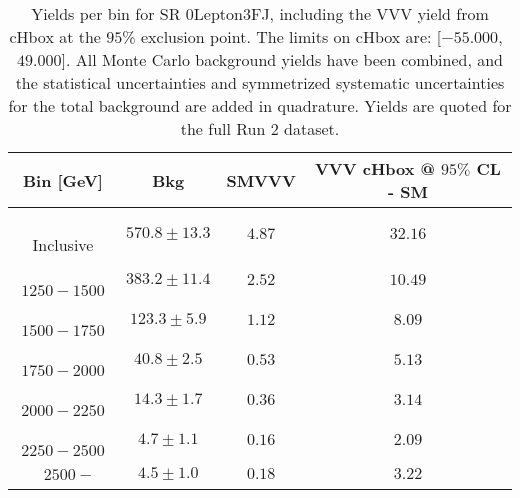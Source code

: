 \begin{table}[!htbp]
    \small
    \center
    \begin{tabular}{c||c|c|c}
    Bin [GeV] & Bkg & SMVVV & \pbox{20cm}{VVV \\ cHbox @ $95\%$ CL - SM \\ }\\
    \hline
    \pbox{20cm}{ ~ \\Inclusive\\ } & $570.8 \pm 13.3$ & $4.87$ & $32.16$\\
    \hline
    \pbox{20cm}{ ~ \\$1250-1500$\\ } & $383.2 \pm 11.4$ & $2.52$ & $10.49$\\
    \hline
    \pbox{20cm}{ ~ \\$1500-1750$\\ } & $123.3 \pm 5.9$ & $1.12$ & $8.09$\\
    \hline
    \pbox{20cm}{ ~ \\$1750-2000$\\ } & $40.8 \pm 2.5$ & $0.53$ & $5.13$\\
    \hline
    \pbox{20cm}{ ~ \\$2000-2250$\\ } & $14.3 \pm 1.7$ & $0.36$ & $3.14$\\
    \hline
    \pbox{20cm}{ ~ \\$2250-2500$\\ } & $4.7 \pm 1.1$ & $0.16$ & $2.09$\\
    \hline
    \pbox{20cm}{ ~ \\$2500-$\\ } & $4.5 \pm 1.0$ & $0.18$ & $3.22$\\
\end{tabular}
    \caption{Yields per bin for SR 0Lepton3FJ, including the VVV yield from cHbox at the $95$\% exclusion point. The limits on cHbox are: [$-55.000$,~$49.000$]. All Monte Carlo background yields have been combined, and the statistical uncertainties and symmetrized systematic uncertainties for the total background are added in quadrature. Yields are quoted for the full Run 2 dataset.}
    \label{tab:0Lepton3FJ$binssignal}
\end{table}

